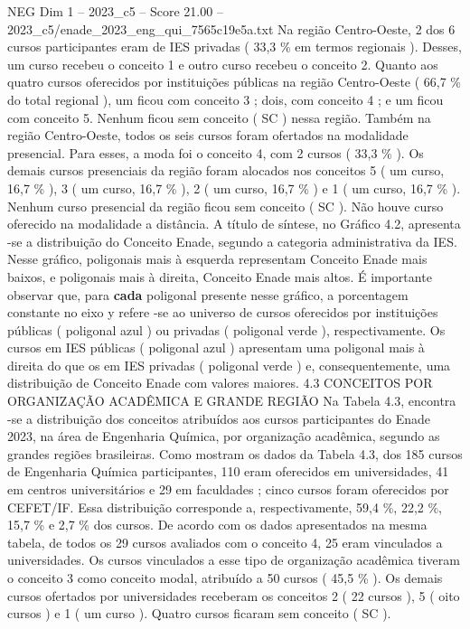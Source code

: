 \begin{textsample}{NEG Dim 1 – 2023\_c5 – Score 21.00 – 2023\_c5/enade\_2023\_eng\_qui\_7565c19e5a.txt}
Na região Centro-Oeste, 2 dos 6 cursos participantes eram de IES privadas ( 33,3 \% em termos regionais ).
Desses, um curso recebeu o conceito 1 e outro curso recebeu o conceito 2.
Quanto aos quatro cursos oferecidos por instituições públicas na região Centro-Oeste ( 66,7 \% do total regional ), um ficou com conceito 3 ; dois, com conceito 4 ; e um ficou com conceito 5.
Nenhum ficou sem conceito ( SC ) nessa região.
Também na região Centro-Oeste, todos os seis cursos foram ofertados na modalidade presencial.
Para esses, a moda foi o conceito 4, com 2 cursos ( 33,3 \% ).
Os demais cursos presenciais da região foram alocados nos conceitos 5 ( um curso, 16,7 \% ), 3 ( um curso, 16,7 \% ), 2 ( um curso, 16,7 \% ) e 1 ( um curso, 16,7 \% ).
Nenhum curso presencial da região ficou sem conceito ( SC ).
Não houve curso oferecido na modalidade a distância.
A título de síntese, no Gráfico 4.2, apresenta -se a distribuição do Conceito Enade, segundo a categoria administrativa da IES.
Nesse gráfico, poligonais mais à esquerda representam Conceito Enade mais baixos, e poligonais mais à direita, Conceito Enade mais altos.
É importante observar que, para \textbf{cada} poligonal presente nesse gráfico, a porcentagem constante no eixo y refere -se ao universo de cursos oferecidos por instituições públicas ( poligonal azul ) ou privadas ( poligonal verde ), respectivamente.
Os cursos em IES públicas ( poligonal azul ) apresentam uma poligonal mais à direita do que os em IES privadas ( poligonal verde ) e, consequentemente, uma distribuição de Conceito Enade com valores maiores. 4.3 CONCEITOS POR ORGANIZAÇÃO ACADÊMICA E GRANDE REGIÃO Na Tabela 4.3, encontra -se a distribuição dos conceitos atribuídos aos cursos participantes do Enade 2023, na área de Engenharia Química, por organização acadêmica, segundo as grandes regiões brasileiras.
Como mostram os dados da Tabela 4.3, dos 185 cursos de Engenharia Química participantes, 110 eram oferecidos em universidades, 41 em centros universitários e 29 em faculdades ; cinco cursos foram oferecidos por CEFET/IF.
Essa distribuição corresponde a, respectivamente, 59,4 \%, 22,2 \%, 15,7 \% e 2,7 \% dos cursos.
De acordo com os dados apresentados na mesma tabela, de todos os 29 cursos avaliados com o conceito 4, 25 eram vinculados a universidades.
Os cursos vinculados a esse tipo de organização acadêmica tiveram o conceito 3 como conceito modal, atribuído a 50 cursos ( 45,5 \% ).
Os demais cursos ofertados por universidades receberam os conceitos 2 ( 22 cursos ), 5 ( oito cursos ) e 1 ( um curso ).
Quatro cursos ficaram sem conceito ( SC ).

\end{textsample}
